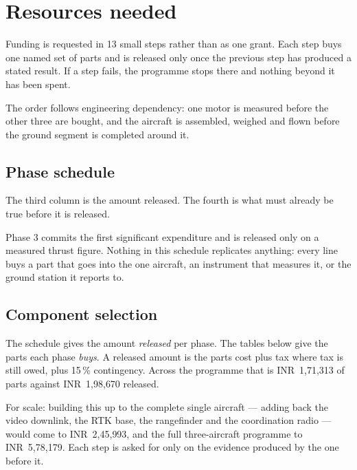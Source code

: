 \documentclass[11pt,a4paper]{article}
\newcommand{\rs}[1]{\mbox{INR~#1}}
\begin{document}
\section{Resources needed}\label{sec:resources}

Funding is requested in 13 small steps rather than as one grant. Each step buys
one named set of parts and is released only once the previous step has produced
a stated result. If a step fails, the programme stops there and nothing beyond
it has been spent.

The order follows engineering dependency: one motor is measured before the
other three are bought, and the aircraft is assembled, weighed and flown before
the ground segment is completed around it.

\subsection{Phase schedule}

The third column is the amount released. The fourth is what must already be
true before it is released.



Phase 3 commits the first significant expenditure and is released only on a
measured thrust figure. Nothing in this schedule replicates anything: every
line buys a part that goes into the one aircraft, an instrument that measures
it, or the ground station it reports to.

\subsection{Component selection}

The schedule gives the amount
\emph{released} per phase. The tables below give the parts each phase
\emph{buys}. A released amount is the parts cost plus tax where tax is still
owed, plus 15\,\% contingency. Across the programme that is \rs{1{,}71{,}313}
of parts against \rs{1{,}98{,}670} released.

For scale: building this up to the complete single aircraft --- adding back the
video downlink, the RTK base, the rangefinder and the coordination
radio --- would come to \rs{2{,}45{,}993}, and the full three-aircraft
programme to \rs{5{,}78{,}179}. Each step is asked for only on the evidence
produced by the one before it.
\end{document}
